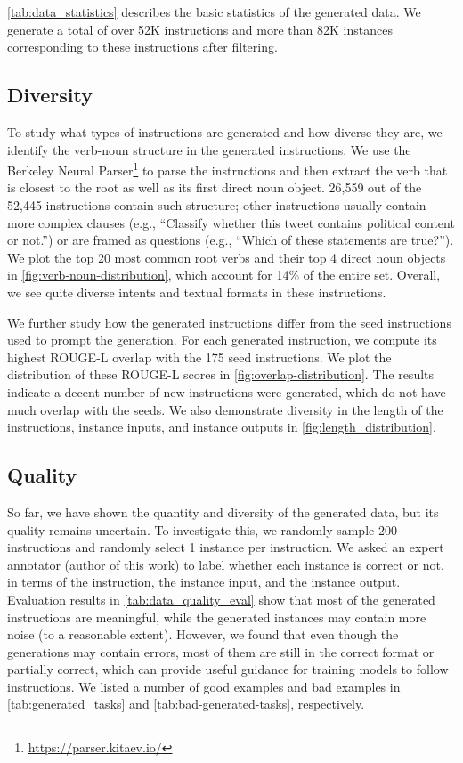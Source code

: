 \autoref{tab:data_statistics} describes the basic statistics of the generated data. We generate a total of over 52K instructions and more than 82K instances corresponding to these instructions after filtering.

\subsection{Diversity}
\label{subsec:diversity}
To study what types of instructions are generated and how diverse they are, we identify the verb-noun structure in the generated instructions. We use the Berkeley Neural Parser\footnote{\url{https://parser.kitaev.io/}} \citep{kitaev-klein-2018-constituency,kitaev-etal-2019-multilingual} to parse the instructions and then extract the verb that is closest to the root as well as its first direct noun object. 26,559 out of the 52,445 instructions contain such structure; other instructions usually contain more complex clauses (e.g., ``Classify whether this tweet contains political content or not.'') or are framed as questions (e.g., ``Which of these statements are true?''). We plot the top 20 most common root verbs and their top 4 direct noun objects in \autoref{fig:verb-noun-distribution}, which account for 14\% of the entire set. Overall, we see quite diverse intents and textual formats in these instructions.

We further study how the generated instructions differ from the seed instructions used to prompt the generation. For each generated instruction, we compute its highest ROUGE-L overlap with the 175 seed instructions. We plot the distribution of these ROUGE-L scores in \autoref{fig:overlap-distribution}. The results indicate a decent number of new instructions were generated, which do not have much overlap with the seeds. We also demonstrate diversity in the length of the instructions, instance inputs, and instance outputs in \autoref{fig:length_distribution}. 

\subsection{Quality}
So far, we have shown the quantity and diversity of the generated data, but its quality remains uncertain. To investigate this, we randomly sample 200 instructions and randomly select 1 instance per instruction. We asked an expert annotator (author of this work) to label whether each instance is correct or not, in terms of the instruction, the instance input, and the instance output. Evaluation results in \autoref{tab:data_quality_eval} show that most of the generated instructions are meaningful, while the generated instances may contain more noise (to a reasonable extent). However, we found that even though the generations may contain errors, most of them are still in the correct format or partially correct, which can provide useful guidance for training models to follow instructions. We listed a number of good examples and bad examples in \autoref{tab:generated_tasks} and \ref{tab:bad-generated-tasks}, respectively.

